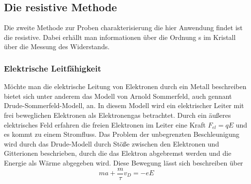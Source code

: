     
    \subsection{Die resistive Methode}
        Die zweite Methode zur Proben charakterisierung die hier Anwendung findet ist die resistive.
        Dabei erhällt man informationen über die Ordnung s im Kristall über die Messung des Widerstands.
        \subsubsection{Elektrische Leitfähigkeit}
            Möchte man die elektrische Leitung von Elektronen durch ein Metall beschreiben bietet sich unter
            anderem das Modell von Arnold Sommerfeld, auch gennant Drude-Sommerfeld-Modell, an. In diesem Modell
            wird ein elektrischer Leiter mit frei beweglichen Elektronen als Elektronengas betrachtet.
            Durch ein äußeres elektrisches Feld erfahren die freien Elektronen im Leiter eine Kraft $F_{el} = qE$
            und es kommt zu einem Stromfluss. Das Problem der unbegrenzten Beschleunigung wird durch das Drude-Modell
            durch Stöße zwischen den Elektronen und Gitterionen beschrieben, durch die das Elektron abgebremst werden
            und die Energie als Wärme abgegeben wird. Diese Bewegung lässt sich beschreiben über
            \begin{equation}
                ma + \frac{m}{\tau}v_D = -eE
            \end{equation}  

